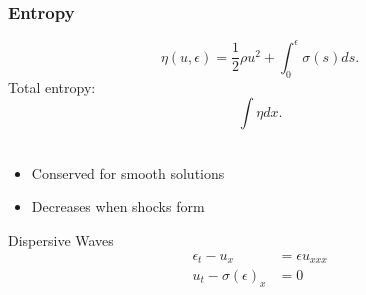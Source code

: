 \documentclass[xcolor=pst,dvipsnames]{beamer}
\begin{document}
\begin{frame} \frametitle{Entropy}
$$\eta(u,\epsilon) = \frac{1}{2}\rho u^2 + \int_0^\epsilon \sigma(s) ds.$$
Total entropy: $$\int \eta dx.$$ \\
\begin{itemize}[<+->]
  \item Conserved for smooth solutions
  \item Decreases when shocks form
\end{itemize} \pause
\begin{center}  \end{center}
\end{frame}


\begin{frame}{Dispersive Waves}
\begin{align*}
\epsilon_t - u_x & = \epsilon u_{xxx} \\
u_t - \sigma(\epsilon)_x & = 0 \\
\end{align*} \pause
\vspace{-1cm}
\begin{center}  \end{center}
\end{frame}


%
\end{document}
